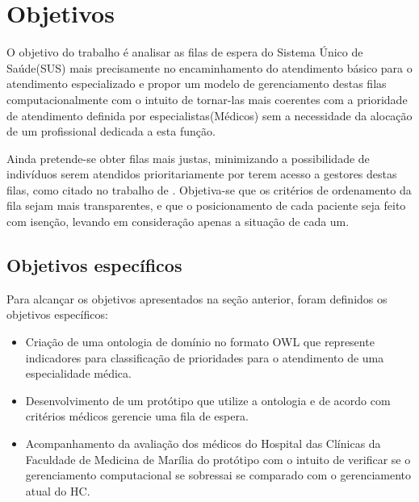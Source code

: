\section{Objetivos}
    O objetivo do trabalho é analisar as filas de espera do Sistema Único de Saúde(SUS) mais precisamente no encaminhamento do atendimento básico para o atendimento especializado e propor um modelo de gerenciamento destas filas computacionalmente com o intuito de tornar-las mais coerentes com a prioridade de atendimento definida por especialistas(Médicos) sem a necessidade da alocação de um profissional dedicada a esta função. 
    
    Ainda pretende-se obter filas mais justas,  minimizando a possibilidade de indivíduos serem atendidos prioritariamente por terem acesso a gestores destas filas, como citado no trabalho de \cite{KRISHNAMURTI2005}. Objetiva-se que os critérios de ordenamento da fila sejam mais transparentes, e que o posicionamento de cada paciente seja feito com isenção, levando em consideração apenas a situação de cada um.

\subsection{Objetivos específicos}

	Para alcançar os objetivos apresentados na seção anterior, foram definidos os objetivos específicos:
    
    \begin{itemize}
    	\item Criação de uma ontologia de domínio no formato OWL que represente indicadores para classificação de prioridades para o atendimento de uma especialidade médica.
        \item Desenvolvimento de um protótipo que utilize a ontologia e de acordo com critérios médicos gerencie uma fila de espera.
        \item Acompanhamento da avaliação dos médicos do Hospital das Clínicas da Faculdade de Medicina de Marília do protótipo com o intuito de verificar se o gerenciamento computacional se sobressai se comparado com o gerenciamento atual do HC.
    \end{itemize}

